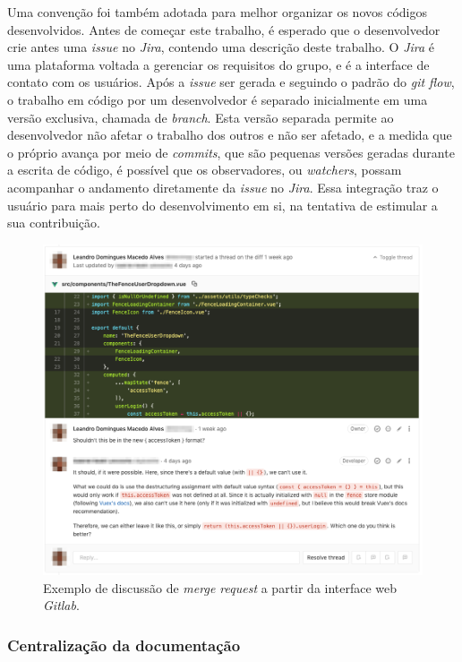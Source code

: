 Uma convenção foi também adotada para melhor organizar os novos códigos desenvolvidos. Antes de começar este trabalho, é esperado que o desenvolvedor crie antes uma \emph{issue} no \emph{Jira}, contendo uma descrição deste trabalho. O \emph{Jira} é uma plataforma voltada a gerenciar os requisitos do grupo, e é a interface de contato com os usuários. Após a \emph{issue} ser gerada e seguindo o padrão do \emph{git flow}, o trabalho em código por um desenvolvedor é separado inicialmente em uma versão exclusiva, chamada de \emph{branch}. Esta versão separada permite ao desenvolvedor não afetar o trabalho dos outros e não ser afetado, e a medida que o próprio avança por meio de \emph{commits}, que são pequenas versões geradas durante a escrita de código, é possível que os observadores, ou \emph{watchers}, possam acompanhar o andamento diretamente da \emph{issue} no \emph{Jira}. Essa integração traz o usuário para mais perto do desenvolvimento em si, na tentativa de estimular a sua contribuição.

\begin{figure}[H]
    \centering
    \includegraphics[width=15cm]{source/4-solucao/images/revisao-codigo.png}
    \caption{Exemplo de discussão de \emph{merge request} a partir da interface web \emph{Gitlab}.}
    \label{fig:revisao-codigo}
\end{figure}

\hypertarget{centralizacao-da-documentacao}{%
\subsubsection{Centralização da documentação}\label{centralizacao-da-documentacao}}

